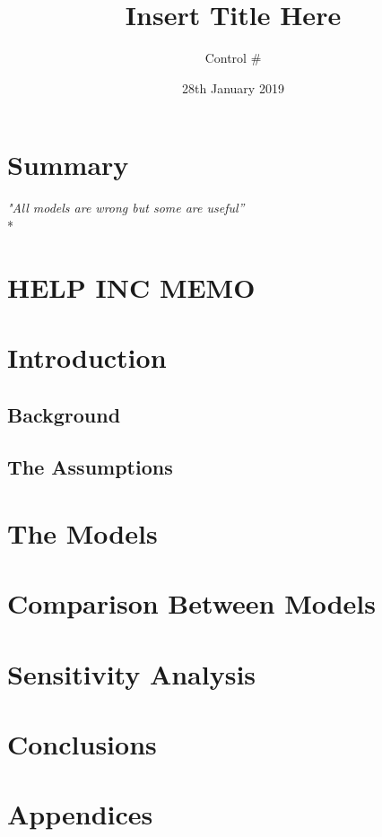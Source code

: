 \documentclass[a4paper,12pt]{article}
\begin{document}
\title{Insert Title Here}
\author{Control \#}
\date{28th January 2019}
\maketitle
\newpage


\section*{\hfil Summary\hfil}
\begin{center}
\textit{"All models are wrong but some are useful''} \\*
\end{center}

\newpage

\section*{\hfil HELP INC MEMO\hfil}
\newpage


\tableofcontents
\newpage
{}


\newpage


\section{Introduction}
\subsection{Background}
\subsection{The Assumptions}

\newpage

\section{The Models}


\newpage

\section{Comparison Between Models}

\newpage

\section{Sensitivity Analysis}

\newpage

\section{Conclusions}

\newpage

\section{Appendices}
\end{document}
